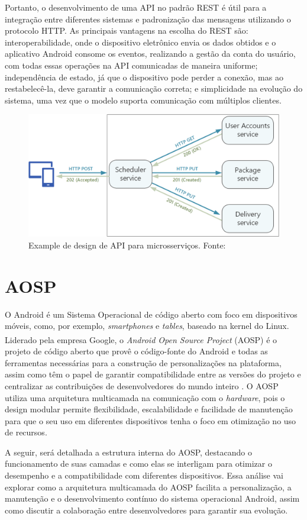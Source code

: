 Portanto, o desenvolvimento de uma API no padrão REST é útil para a integração entre diferentes sistemas e  padronização das mensagens 
utilizando o protocolo HTTP. As principais vantagens na escolha do REST são: interoperabilidade, onde o 
dispositivo eletrônico envia os dados obtidos e o aplicativo Android consome os eventos, realizando a 
gestão da conta do usuário, com todas essas operações na API comunicadas de maneira uniforme; independência 
de estado, já que o dispositivo pode perder a conexão, mas ao restabelecê-la, deve garantir a comunicação correta; e simplicidade 
na evolução do sistema, uma vez que o modelo suporta comunicação com múltiplos clientes.

\begin{figure}[ht]
    \centering
    \includegraphics[width=.45\textwidth]{img/api-design.png}
    \caption{Example de design de API para microsserviços. Fonte:\cite{example-design-api}}\label{figAPIDesign}
\end{figure}

\section{AOSP}

O Android é um Sistema Operacional de código aberto com foco em dispositivos móveis, como, por exemplo, \textit{smartphones} e \textit{tables}, baseado na kernel do Linux. 
Liderado pela empresa Google\textsuperscript{\textregistered}, o \textit{Android Open Source Project} (AOSP) é o projeto de código aberto que provê o código-fonte 
do Android e todas as ferramentas necessárias para a construção de personalizações na plataforma, assim como têm o papel de garantir compatibilidade entre as 
versões do projeto e centralizar as contribuições de desenvolvedores do mundo inteiro \cite{aosp-documentation}. O AOSP utiliza uma arquitetura multicamada
na comunicação com o \textit{hardware}, pois o design modular permite flexibilidade, escalabilidade e facilidade de manutenção para que o seu uso em diferentes dispositivos tenha o foco
em otimização no uso de recursos. 

A seguir, será detalhada a estrutura interna do AOSP, destacando o funcionamento de suas camadas e como elas se interligam para otimizar o desempenho e a
compatibilidade com diferentes dispositivos. Essa análise vai explorar como a arquitetura multicamada do AOSP facilita a personalização, a manutenção e o
desenvolvimento contínuo do sistema operacional Android, assim como discutir a colaboração entre desenvolvedores para garantir sua evolução.

